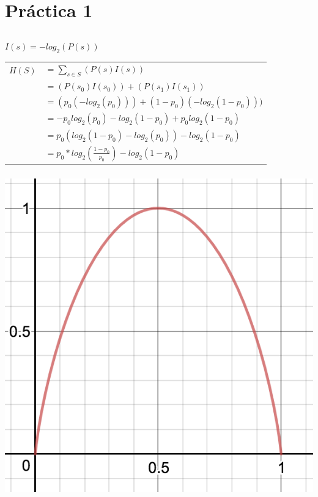 \section{Práctica 1}

\subsection{}

\subsubsection{}
$I(s) = -log_2(P(s))$

\begin{tabular}{rl}
$H(S)$ & $= \sum_{s \in S}(P(s) I(s))$ \\
& $= (P(s_0) I(s_0)) + (P(s_1) I(s_1))$ \\
& $= (p_0 (-log_2(p_0))) + (1 - p_0) (-log_2(1 - p_0)))$ \\
& $= -p_0 log_2(p_0) - log_2(1 - p_0) + p_0 log_2(1 - p_0)$ \\
& $= p_0(log_2(1 - p_0) -log_2(p_0)) - log_2(1 - p_0)$ \\
& $= p_0 * log_2(\frac{1 - p_0}{p_0}) - log_2(1 - p_0)$ \\
\end{tabular}

\subsubsection{}

\includegraphics{imagenes/1_1_b.png}

